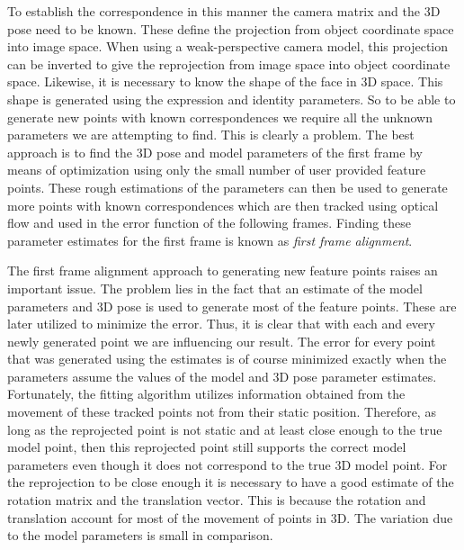 \documentclass[11pt,a4paper,twoside]{report}
\begin{document}
To establish the correspondence in this manner the camera matrix and the 3D pose
need to be
known. These define the projection from object coordinate space into image
space. When using a weak-perspective camera model, this projection can be inverted to give the reprojection from image space into
object coordinate space. Likewise, it is necessary to know the shape of the face in 3D space. This
shape is generated using the expression and identity parameters. So to be able
to generate new points with known correspondences we require all the unknown parameters
we are attempting to find. This is clearly a problem. The best approach is to find the 3D pose and model parameters of the
first frame by means of optimization using only the small number of user provided
feature points. These rough estimations of the parameters can then be used to
generate more points with known correspondences which are then tracked using
optical flow and used in the error function of the following frames. Finding
these parameter estimates for the first frame is known as \textit{first frame
  alignment}.

The first frame alignment approach to generating new feature points raises an
important issue. The problem lies in the fact that an estimate of the model
parameters and 3D pose is used to generate most of the feature points. These are later 
utilized to minimize the error. Thus, it is clear that with each and every newly
generated point we are influencing our result. The error for every point that was generated
using the estimates is of course minimized exactly when the parameters
assume the values of the model and 3D pose parameter estimates. Fortunately,
the fitting algorithm utilizes information obtained from the movement of these tracked
points not from their static position. Therefore, as long as the reprojected
point is not static and at least
close enough to the true model point, then this reprojected point still supports
the correct model parameters even though it does not correspond to the true
3D model point. For the reprojection to be close enough it is necessary to have
a good estimate of the rotation matrix and the translation vector. This is
because the rotation and translation account for most of the movement of points in 3D. The variation
due to the model parameters is small in comparison.
\end{document}
